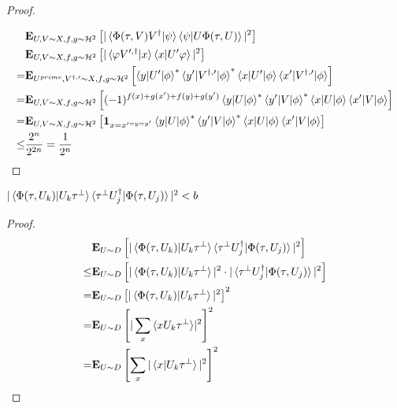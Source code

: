 \documentclass[manuscript,screen,review]{acmart}
\begin{document}
\begin{proof}
\begin{equation*}
\begin{split}
    \end{split}
  \end{equation*}
  \begin{equation*}
    \begin{split}
& \exppm{ |\braket{\Phi(\tau,V) V^{\dagger}|\psi}\braket{\psi|U\Phi(\tau,U)}|^{2} }{U,V \sim X , f,g\sim \mathcal{H}^2} \\  
      & \exppm{ |\braket{\varphi V^{\prime, \dagger}|x}\braket{x|U^{\prime}\varphi}|^{2} }{U,V \sim X , f,g\sim \mathcal{H}^2}  \\ 
= & \exppm{ \braket{y|U^{\prime}|\phi}^{*} \braket{y^{\prime}|V^{\dagger, \prime}|\phi}^{*} \braket{x|U^{\prime}|\phi} \braket{x^{\prime}|V^{\dagger, \prime}|\phi}}{ U^{prime},V^{\dagger, \prime} \sim X , f,g\sim \mathcal{H}^2} \\
= & \exppm{ (-1)^{f(x)+g(x^{\prime})+f(y)+g(y^{\prime})} \braket{y|U|\phi}^{*} \braket{y^{\prime}|V|\phi}^{*} \braket{x|U|\phi} \braket{x^{\prime}|V|\phi}}{ U,V \sim X , f,g\sim \mathcal{H}^2} \\
= & \exppm{ \mathbf{1}_{x=x^{\prime=y=y^{\prime}}} \braket{y|U|\phi}^{*} \braket{y^{\prime}|V|\phi}^{*} \braket{x|U|\phi} \braket{x^{\prime}|V|\phi}}{ U,V \sim X , f,g\sim \mathcal{H}^2} \\
\le &\frac{2^{n}}{2^{2n}} = \frac{1}{2^n}
    \end{split}
  \end{equation*}


\end{proof}

\begin{claim}
  $|\braket{\Phi(\tau,U_{k})|U_{k}\tau^{\perp}}\braket{\tau^{\perp}U^{\dagger}_{j}|\Phi(\tau,U_{j})}|^{2} < b$
\end{claim}
\begin{proof}
  
  \begin{equation*}
    \begin{split}
      & \exppm{|\braket{\Phi(\tau,U_{k})|U_{k}\tau^{\perp}}\braket{\tau^{\perp}U^{\dagger}_{j}|\Phi(\tau,U_{j})}|^{2} }{U \sim D  } \\
      \le &  \exppm{|\braket{\Phi(\tau,U_{k})|U_{k}\tau^{\perp}}|^{2}\cdot |\braket{\tau^{\perp}U^{\dagger}_{j}|\Phi(\tau,U_{j})}|^{2} }{U \sim D  } \\ 
      = &  \exppm{|\braket{\Phi(\tau,U_{k})|U_{k}\tau^{\perp}}|^{2} }{U \sim D  }^{2} \\ 
      = & \exppm{|\sum_{x}{\braket{xU_{k}\tau^{\perp}}} |^{2}}{U \sim D  }^{2} \\
      = & \exppm{\sum_{x}{|\braket{x|U_{k}\tau^{\perp}}|^{2}} }{U \sim D  }^{2} 
    \end{split}
  \end{equation*}
\end{proof}
\end{document}
